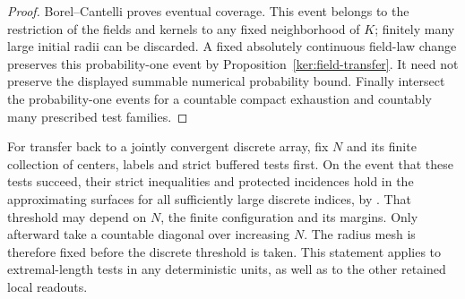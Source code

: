 \begin{proof}
Borel--Cantelli proves eventual coverage.  This event belongs to
the restriction of the fields and kernels to any fixed neighborhood
of \(K\); finitely many large initial radii can be discarded.
A fixed absolutely continuous field-law change preserves this
probability-one event by Proposition~\ref{ker:field-transfer}.
It need not preserve the displayed summable numerical probability
bound.  Finally intersect the probability-one events for a countable
compact exhaustion and countably many prescribed test families.
\end{proof}

For transfer back to a jointly convergent discrete array, fix \(N\)
and its finite collection of centers, labels and strict buffered tests
first. On the event that these tests succeed, their strict inequalities
and protected incidences hold in the approximating surfaces for all
sufficiently large discrete indices, by
. That threshold may depend on
\(N\), the finite configuration and its margins. Only afterward take a
countable diagonal over increasing \(N\). The radius mesh is therefore
fixed before the discrete threshold is taken. This statement applies
to extremal-length tests in any deterministic units, as well as to the
other retained local readouts.
